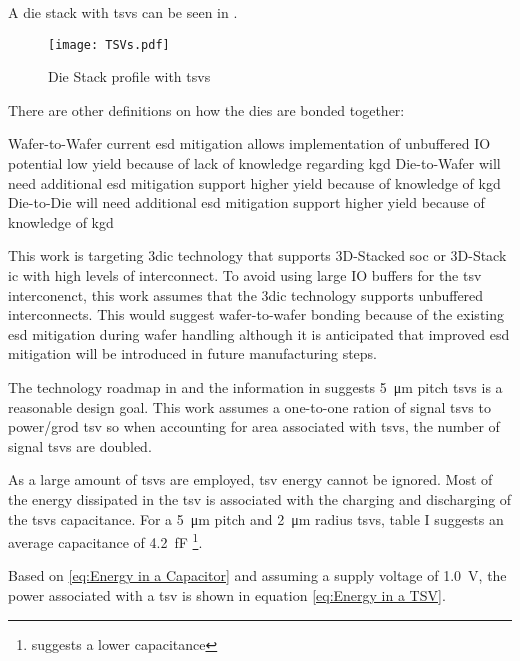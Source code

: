A die stack with \acp{tsv} can be seen in .

\begin{figure}[h]
\centering
\captionsetup{justification=centering}
\captionsetup{width=.9\linewidth}
\centerline{
\mbox{\texttt{[image: TSVs.pdf]}}
}
\caption{Die Stack profile \cite{itrs2015_interconn} with \acp{tsv}}
\label{fig:tsv}
\end{figure}

There are other definitions on how the dies are bonded together:
\begin{outline}
  \1 Wafer-to-Wafer
    \2 current \ac{esd} mitigation allows implementation of unbuffered IO
    \2 potential low yield because of lack of knowledge regarding \ac{kgd}
  \1 Die-to-Wafer
    \2 will need additional \ac{esd} mitigation support
    \2 higher yield because of knowledge of \ac{kgd}
  \1 Die-to-Die
    \2 will need additional \ac{esd} mitigation support
    \2 higher yield because of knowledge of \ac{kgd}
\end{outline}

This work is targeting \ac{3dic} technology that supports 3D-Stacked \ac{soc} or 3D-Stack \ac{ic} with high levels of interconnect.
To avoid using large IO buffers for the \ac{tsv} interconenct, this work assumes that the \ac{3dic} technology supports unbuffered interconnects. 
This would suggest wafer-to-wafer bonding because of the existing \ac{esd} mitigation during wafer handling although it is anticipated that improved \ac{esd} mitigation will be introduced in future manufacturing steps.

The technology roadmap in \cite{itrs2015_interconn} and the information in \cite{patti2014} suggests \SI{5}{\micro\meter} pitch \acp{tsv} is a reasonable design goal. This work assumes a one-to-one ration of signal \acp{tsv} to power/grod \ac{tsv} so when accounting for area associated with \acp{tsv}, the number of signal \acp{tsv} are doubled.

As a large amount of \acp{tsv} are employed, \ac{tsv} energy cannot be ignored.
Most of the energy dissipated in the \ac{tsv} is associated with the charging and discharging of the \acp{tsv} capacitance. For a \SI{5}{\micro\meter} pitch and \SI{2}{\micro\meter} radius \acp{tsv}, \cite{Bamberg2017} table I suggests an average capacitance of \SI{4.2}{\femto\farad} \footnote{\cite{tezzaron:preso} suggests a lower capacitance}.

Based on \eqref{eq:Energy in a Capacitor} and assuming a supply voltage of \SI{1.0}{\volt}, the power associated with a \ac{tsv} is shown in equation \eqref{eq:Energy in a TSV}.


